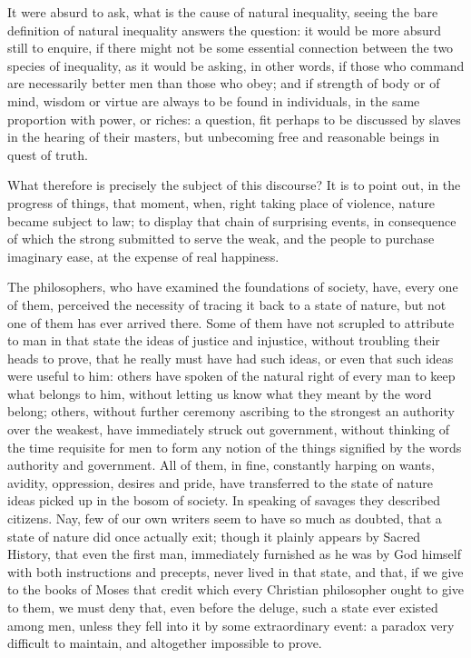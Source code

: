 \documentclass[11pt,twocolumn]{ltugboat}
\begin{document}
It were absurd to ask, what is the cause of natural inequality, seeing
the bare definition of natural inequality answers the question: it
would be more absurd still to enquire, if there might not be some
essential connection between the two species of inequality, as it
would be asking, in other words, if those who command are necessarily
better men than those who obey; and if strength of body or of mind,
wisdom or virtue are always to be found in individuals, in the same
proportion with power, or riches: a question, fit perhaps to be
discussed by slaves in the hearing of their masters, but unbecoming
free and reasonable beings in quest of truth.

What therefore is precisely the subject of this discourse? It is to
point out, in the progress of things, that moment, when, right taking
place of violence, nature became subject to law; to display that chain
of surprising events, in consequence of which the strong submitted to
serve the weak, and the people to purchase imaginary ease, at the
expense of real happiness.

The philosophers, who have examined the foundations of society, have,
every one of them, perceived the necessity of tracing it back to a
state of nature, but not one of them has ever arrived there. Some of
them have not scrupled to attribute to man in that state the ideas of
justice and injustice, without troubling their heads to prove, that he
really must have had such ideas, or even that such ideas were useful
to him: others have spoken of the natural right of every man to keep
what belongs to him, without letting us know what they meant by the
word belong; others, without further ceremony ascribing to the
strongest an authority over the weakest, have immediately struck out
government, without thinking of the time requisite for men to form any
notion of the things signified by the words authority and government.
All of them, in fine, constantly harping on wants, avidity,
oppression, desires and pride, have transferred to the state of nature
ideas picked up in the bosom of society. In speaking of savages they
described citizens. Nay, few of our own writers seem to have so much
as doubted, that a state of nature did once actually exit; though it
plainly appears by Sacred History, that even the first man,
immediately furnished as he was by God himself with both instructions
and precepts, never lived in that state, and that, if we give to the
books of Moses that credit which every Christian philosopher ought to
give to them, we must deny that, even before the deluge, such a state
ever existed among men, unless they fell into it by some extraordinary
event: a paradox very difficult to maintain, and altogether impossible
to prove.
\end{document}
